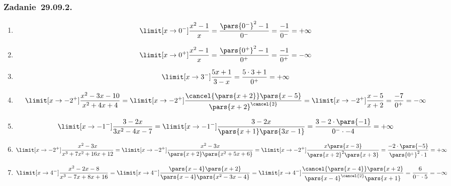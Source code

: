 \subsubsection*{Zadanie~29.09.2.}
\begin{enumerate}[label={\alph*)}]
    \item
        \begin{equation*}
            \limit[x \to 0^-] \frac{x^2 - 1}{x}
                = \frac{\pars{0^-}^2 - 1}{0^-}
                = \frac{-1}{0^-}
                = +\infty
        \end{equation*}
    \item
        \begin{equation*}
            \limit[x \to 0^+] \frac{x^2 - 1}{x}
                = \frac{\pars{0^+}^2 - 1}{0^+}
                = \frac{-1}{0^+}
                = -\infty
        \end{equation*}
    \item
        \begin{equation*}
            \limit[x \to 3^-] \frac{5x + 1}{3 - x}
                = \frac{5 \cdot 3 + 1}{0^+}
                = +\infty
        \end{equation*}
    \addtocounter{enumi}{1}
    \item
        \begin{equation*}
            \limit[x \to -2^+] \frac{x^2 - 3x - 10}{x^2 + 4x + 4}
                = \limit[x \to -2^+] \frac{\cancel{\pars{x + 2}}\pars{x - 5}}{\pars{x + 2}^{\cancel{2}}}
                = \limit[x \to -2^+] \frac{x - 5}{x + 2}
                = \frac{-7}{0^+}
                = -\infty
        \end{equation*}
    \item
        \begin{equation*}
            \limit[x \to -1^-] \frac{3 - 2x}{3x^2 - 4x - 7}
                = \limit[x \to -1^-]\frac{3 - 2x}{\pars{x + 1}\pars{3x - 1}}
                = \frac{3 - 2 \cdot \pars{-1}}{0^- \cdot -4}
                = +\infty
        \end{equation*}
    \item
        \begin{equation*}
            \limit[x \to -2^+] \frac{x^2 - 3x}{x^3 + 7x^2 + 16x + 12}
                = \limit[x \to -2^+] \frac{x^2 - 3x}{\pars{x + 2}\pars{x^2 + 5x + 6}}
                = \limit[x \to -2^+] \frac{x\pars{x - 3}}{\pars{x + 2}^2\pars{x + 3}}
                = \frac{-2 \cdot \pars{-5}}{\pars{0^+}^2 \cdot 1}
                = +\infty
        \end{equation*}
    \item
        \begin{equation*}
            \limit[x \to 4^-] \frac{x^2 - 2x - 8}{x^3 - 7x + 8x + 16}
                = \limit[x \to 4^-] \frac{\pars{x - 4}\pars{x + 2}}{\pars{x - 4}\pars{x^2 - 3x - 4}}
                = \limit[x \to 4^-] \frac{\cancel{\pars{x - 4}}\pars{x + 2}}{\pars{x - 4}^{\cancel{2}}\pars{x + 1}}
                = \frac{6}{0^- \cdot 5}
                = -\infty
        \end{equation*}
\end{enumerate}
